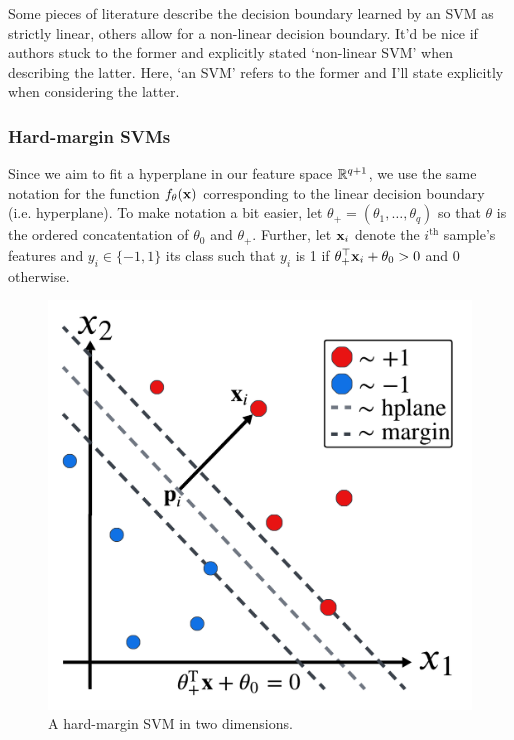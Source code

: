 \documentclass[11pt]{article}
\begin{document}
\begin{tcolorbox}[title={\centering\textbf{Inconsistent terminology surrounding SVMs}}, colback=myLightBlue, colbacktitle=myDarkBlue, colframe=myDarkBlue, coltitle=white]
    Some pieces of literature describe the decision boundary learned by an SVM as strictly linear, others allow for a non-linear decision boundary. It'd be nice if authors stuck to the former and explicitly stated `non-linear SVM' when describing the latter. Here, `an SVM' refers to the former and I'll state explicitly when considering the latter.
\end{tcolorbox}

\subsubsection{Hard-margin SVMs}
Since we aim to fit a hyperplane in our feature space $\mathbb{R}^{q+1}$, we use the same notation for the function $f_{\theta}(\mathbf{x})$ corresponding to the linear decision boundary (i.e. hyperplane). To make notation a bit easier, let $\theta_+=(\theta_1,\dots,\theta_q)$ so that $\theta$ is the ordered concatentation of $\theta_0$ and $\theta_+$. Further, let $\mathbf{x}_i$ denote the $i^{\text{th}}$ sample's features and $y_i\in\{-1,1\}$ its class such that $y_i$ is 1 if $\theta_+^\top \mathbf{x}_i+\theta_0>0$ and 0 otherwise.

\begin{figure}[t]
    \centering
    \includegraphics[width=0.75\columnwidth]{./figures/supervised_learning/SVM_hard_margin.pdf}
    \caption{A hard-margin SVM in two dimensions.}
    \label{fig:SVM_hard_margin}
\end{figure}
\end{document}
